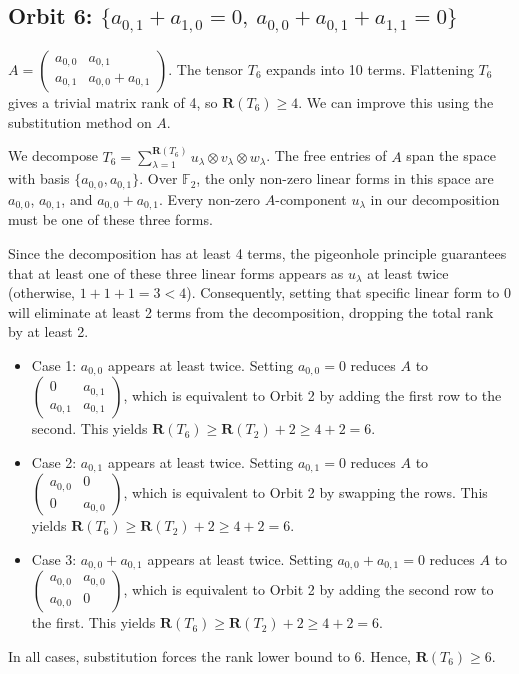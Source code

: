 \documentclass[11pt]{article}
\begin{document}
\subsection*{Orbit 6: $\{a_{0,1}+a_{1,0}=0,\ a_{0,0}+a_{0,1}+a_{1,1}=0\}$}
$A=
  \begin{pmatrix}
    a_{0,0} & a_{0,1}         \\
    a_{0,1} & a_{0,0}+a_{0,1}
  \end{pmatrix}$.
The tensor $T_6$ expands into 10 terms. Flattening $T_6$ gives a trivial matrix rank of 4, so $\mathbf{R} (T_6) \geq 4$. We can improve this using the substitution method on $A$.

We decompose $T_6 = \sum_{\lambda=1}^{\mathbf{R} (T_6)} u_\lambda \otimes v_\lambda \otimes w_\lambda$. The free entries of $A$ span the space with basis $\{a_{0,0}, a_{0,1}\}$. Over $\mathbb{F}_2$, the only non-zero linear forms in this space are $a_{0,0}$, $a_{0,1}$, and $a_{0,0}+a_{0,1}$. Every non-zero $A$-component $u_\lambda$ in our decomposition must be one of these three forms.

Since the decomposition has at least 4 terms, the pigeonhole principle guarantees that at least one of these three linear forms appears as $u_\lambda$ at least twice (otherwise, $1+1+1=3 < 4$). Consequently, setting that specific linear form to $0$ will eliminate at least 2 terms from the decomposition, dropping the total rank by at least 2.
\begin{itemize}
  \item Case 1: $a_{0,0}$ appears at least twice. Setting $a_{0,0}=0$ reduces $A$ to $\begin{pmatrix} 0 & a_{0,1} \\ a_{0,1} & a_{0,1} \end{pmatrix}$, which is equivalent to Orbit 2 by adding the first row to the second. This yields $\mathbf{R}(T_6) \geq \mathbf{R}(T_2)+2 \geq 4+2 = 6$.
  \item Case 2: $a_{0,1}$ appears at least twice. Setting $a_{0,1}=0$ reduces $A$ to $\begin{pmatrix} a_{0,0} & 0 \\ 0 & a_{0,0} \end{pmatrix}$, which is equivalent to Orbit 2 by swapping the rows. This yields $\mathbf{R}(T_6) \geq \mathbf{R}(T_2)+2 \geq 4+2 = 6$.
  \item Case 3: $a_{0,0}+a_{0,1}$ appears at least twice. Setting $a_{0,0}+a_{0,1}=0$ reduces $A$ to $\begin{pmatrix} a_{0,0} & a_{0,0} \\ a_{0,0} & 0 \end{pmatrix}$, which is equivalent to Orbit 2 by adding the second row to the first. This yields $\mathbf{R}(T_6) \geq \mathbf{R}(T_2)+2 \geq 4+2 = 6$.
\end{itemize}
In all cases, substitution forces the rank lower bound to 6. Hence, $\mathbf{R} (T_6) \geq 6$.
\end{document}
